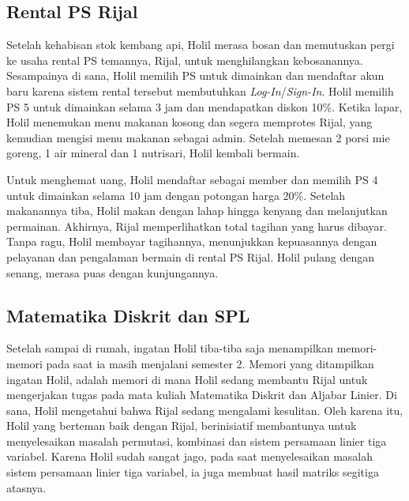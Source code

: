\documentclass[../main.tex]{subfiles}
\begin{document}
    \subsection{Rental PS Rijal}
    Setelah kehabisan stok kembang api, Holil merasa bosan dan memutuskan pergi ke usaha rental PS temannya, Rijal, untuk menghilangkan kebosanannya. Sesampainya di sana, Holil memilih PS untuk dimainkan dan mendaftar akun baru karena sistem rental tersebut membutuhkan \textit{Log-In}/\textit{Sign-In}. Holil memilih PS 5 untuk dimainkan selama 3 jam dan mendapatkan diskon 10\%. Ketika lapar, Holil menemukan menu makanan kosong dan segera memprotes Rijal, yang kemudian mengisi menu makanan sebagai admin. Setelah memesan 2 porsi mie goreng, 1 air mineral dan 1 nutrisari, Holil kembali bermain.

    Untuk menghemat uang, Holil mendaftar sebagai member dan memilih PS 4 untuk dimainkan selama 10 jam dengan potongan harga 20\%. Setelah makanannya tiba, Holil makan dengan lahap hingga kenyang dan melanjutkan permainan. Akhirnya, Rijal memperlihatkan total tagihan yang harus dibayar. Tanpa ragu, Holil membayar tagihannya, menunjukkan kepuasannya dengan pelayanan dan pengalaman bermain di rental PS Rijal. Holil pulang dengan senang, merasa puas dengan kunjungannya.


    \subsection{Matematika Diskrit dan SPL}

    Setelah sampai di rumah, ingatan Holil tiba-tiba saja menampilkan memori-memori pada saat ia masih menjalani semester 2. Memori yang ditampilkan ingatan Holil, adalah memori di mana Holil sedang membantu Rijal untuk mengerjakan tugas pada mata kuliah Matematika Diskrit dan Aljabar Linier. Di sana, Holil mengetahui bahwa Rijal sedang mengalami kesulitan. Oleh karena itu, Holil yang berteman baik dengan Rijal, berinisiatif membantunya untuk menyelesaikan masalah permutasi, kombinasi dan sistem persamaan linier tiga variabel. Karena Holil sudah sangat jago, pada saat menyelesaikan masalah sistem persamaan linier tiga variabel, ia juga membuat hasil matriks segitiga atasnya.

\end{document}
